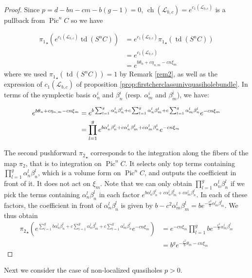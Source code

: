 \documentclass{article}
\theoremstyle{definition}
\DeclareMathOperator{\pic}{\text{Pic}}
\DeclareMathOperator{\ch}{ch}
\DeclareMathOperator{\td}{td}
\newcommand{\eq}[2][1]{
\begin{equation*}
	\addtolength{\fboxsep}{0pt}
	\begin{alignedat}{#1}
	#2
	\end{alignedat}
\end{equation*}
}
\begin{document}
 \begin{proof}
Since $p=d-bn-cm-b(g-1)=0$, $\ch(\mathcal{L}_{b,c})=e^{c_1(\mathcal{L}_{b,c})}$ is a pullback from $\pic^n C$ so we have 

\begin{align*}
    {\pi_1}_\star \left( e^{c_1(\mathcal{L}_{b,c})}\td(S^n C)\right)&=e^{c_1(\mathcal{L}_{b,c})} {\pi_1}_\star \left( \td(S^n C)\right)\\
    &=e^{c_1(\mathcal{L}_{b,c})}\\
    &=e^{b\theta_n + c \eta_{n,m}-cn\xi_m}
\end{align*}
where we used ${\pi_1}_\star \left( \td(S^n C)\right)=1$ by Remark \ref{rem2}, as well as the expression of $c_1(\mathcal{L}_{b,c})$ of proposition \ref{prop:firstcherclassunivquasiholebundle}. In terms of the symplectic basis $\alpha_n^i$ and $\beta_n^i$ (resp. $\alpha_m^i$ and $\beta_m^i$), we have:

\eq{
e^{b\theta_n + c \eta_{n,m}-cn\xi_m}&=e^{b\sum_{l=1}^g  \alpha_n^l \beta_n^l + c \sum_{l=1}^g \alpha_n^l \beta_m^l + c \sum_{l=1}^g \alpha_m^l \beta_n^l} e^{-cn\xi_m}\\
&=\prod_{l=1}^g e^{b \alpha_n^l \beta_n^l + c \alpha_n^l \beta_m^l + c \alpha_m^l \beta_n^l} e^{-cn\xi_m}
}

The second pushforward ${\pi_2}_\star$ corresponds to the integration along the fibers of the map $\pi_2$, that is to integration on $\pic^n C$. It selects only top terms containing $\prod_{l=1}^g \alpha_n^l \beta_n^l$, which is a volume form on $\pic^n C$, and outputs the coefficient in front of it. It does not act on $\xi_m$. Note that we can only obtain $\prod_{l=1}^g \alpha_n^l \beta_n^l$ if we pick the terms containing $\alpha_n^l \beta_n^l$ in each factor $e^{b\alpha_n^l \beta_n^l + c \alpha_n^l \beta_m^l + c \alpha_m^l \beta_n^l}$. In each of these factors, the coefficient in front of $\alpha_n^l \beta_n^l$ is given by $b-c^2 \alpha_m^l \beta_m^l=be^{-\frac{c^2}{b}\alpha_m^l \beta_m^l}$.
We thus obtain
\begin{align}\nonumber
{\pi_2}_\star \left( e^{\sum_{l=1}^g  b \alpha_n^l \beta_n^l + c \sum_{l=1}^g \alpha_n^l \beta_m^l + c \sum_{l=1}^g  \alpha_m^l \beta_n^l} e^{-cn\xi_m} \right)&= e^{-cn\xi_m} \prod_{l=1}^g be^{-\frac{c^2}{b}\alpha_m^l \beta_m^l}\\
&=b^g e^{-\frac{c^2}{b} \theta_m - cn \xi_m}
\end{align}
\end{proof}
Next we consider the case of non-localized quasiholes $p>0$.
\end{document}
